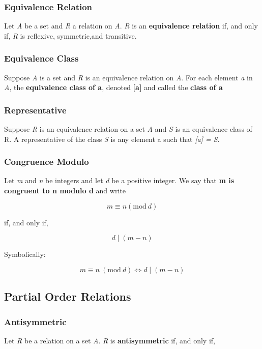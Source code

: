 \documentclass[12pt]{article}
\begin{document}
\subsubsection*{Equivalence Relation}
Let \textit{A} be a set and \textit{R} a relation on \textit{A}. \textit{R} is an \textbf{equivalence relation} if, and only if, \textit{R} is reflexive, symmetric,and transitive.

\subsubsection*{Equivalence Class}
Suppose \textit{A} is a set and \textit{R} is an equivalence relation on \textit{A}. For each element \textit{a} in \textit{A}, the \textbf{equivalence class of a}, denoted \textbf{[a]} and called the \textbf{class of a}

\subsubsection*{Representative}
Suppose \textit{R} is an equivalence relation on a set \textit{A} and \textit{S} is an equivalence class of R. A representative of the class \textit{S} is any element a such that \textit{[a] = S}.

\subsubsection*{Congruence Modulo}
Let \textit{m} and \textit{n} be integers and let \textit{d} be a positive integer. We say that \textbf{m is congruent to n modulo d} and write

\begin{equation*}
m \equiv n (\text{mod} \ d)
\end{equation*}

if, and only if,

\begin{equation*}
d \mid (m - n)
\end{equation*}

Symbolically:

\begin{equation*}
m \equiv n \ (\text{mod} \ d) \Leftrightarrow d \mid (m - n)
\end{equation*}

\setcounter{subsection}{4}
\subsection{Partial Order Relations}
\subsubsection*{Antisymmetric}
Let \textit{R} be a relation on a set \textit{A}. \textit{R} is \textbf{antisymmetric} if, and only if,
\end{document}
